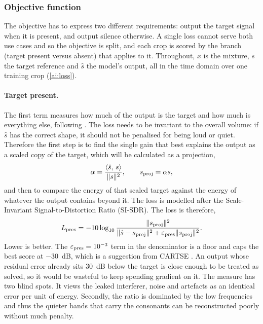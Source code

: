 \subsubsection{Objective function}
\label{sec:objective}

The objective has to express two different requirements: output the target signal when it is present, and output silence otherwise. A single loss cannot serve both use cases and so the objective is split, and each crop is scored by the branch (target present versus absent) that applies to it. Throughout, $x$ is the mixture, $s$ the target reference and $\hat{s}$ the model's output, all in the time domain over one training crop (\ref{ai:loss}).

\paragraph{Target present.}
The first term measures how much of the output is the target and how much is everything else, following \cite{li2026cartse}. The loss needs to be invariant to the overall volume: if $\hat{s}$ has the correct shape, it should not be penalised for being loud or quiet. Therefore the first step is to find the single gain that best explains the output as a scaled copy of the target, which will be calculated as a projection, 
\begin{equation}
\alpha = \frac{\langle \hat{s},\, s \rangle}{\lVert s \rVert^2},
\qquad
s_\textup{proj} = \alpha s,
\label{eq:alpha}
\end{equation}
and then to compare the energy of that scaled target against the energy of whatever the output contains beyond it. The loss is modelled after the Scale-Invariant Signal-to-Distortion Ratio (SI-SDR). The loss is therefore,
\begin{equation}
L_\textup{pres}
  = -10 \log_{10}
    \frac{\lVert s_\textup{proj} \rVert^2}
         {\lVert \hat{s} - s_\textup{proj} \rVert^2 + \varepsilon_\textup{pres} \lVert s_\textup{proj} \rVert^2}.
\label{eq:lpres}
\end{equation}
Lower is better. The $\varepsilon_\textup{pres} = 10^{-3}$ term in the denominator is a floor and caps the best score at \SI{-30}{dB}, which is a suggestion from CARTSE \cite{li2026cartse}. An output whose residual error already sits \SI{30}{dB} below the target is close enough to be treated as solved, so it would be wasteful to keep spending gradient on it. The measure has two blind spots. It views the leaked interferer, noise and artefacts as an identical error per unit of energy. Secondly, the ratio is dominated by the low frequencies and thus the quieter bands that carry the consonants can be reconstructed poorly without much penalty. 

